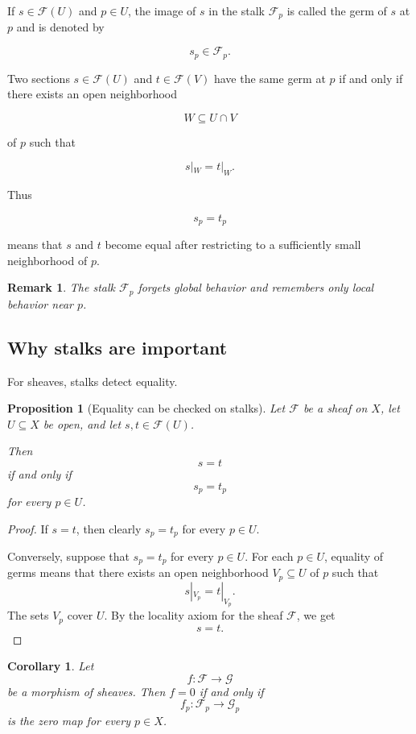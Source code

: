 \documentclass[12pt,a4paper]{article}
\theoremstyle{notespace}
\newtheorem{proposition}[definition]{Proposition}
\newtheorem{corollary}[definition]{Corollary}
\newtheorem{remark}[definition]{Remark}
\begin{document}
If $s \in \mathcal F(U)$ and $p \in U$, the image of $s$ in the stalk
$\mathcal F_p$ is called the germ of $s$ at $p$ and is denoted by

\[
s_p \in \mathcal F_p.
\]

Two sections $s \in \mathcal F(U)$ and $t \in \mathcal F(V)$ have the same germ
at $p$ if and only if there exists an open neighborhood

\[
W \subseteq U \cap V
\]

of $p$ such that

\[
s|_W = t|_W.
\]

Thus

\[
s_p=t_p
\]

means that $s$ and $t$ become equal after restricting to a sufficiently small
neighborhood of $p$.

\begin{remark}
	The stalk $\mathcal F_p$ forgets global behavior and remembers only local
	behavior near $p$.
\end{remark}

\subsection{Why stalks are important}
For sheaves, stalks detect equality.

\begin{proposition}[Equality can be checked on stalks]
	Let $\mathcal F$ be a sheaf on $X$, let $U \subseteq X$ be open, and let
	$s,t \in \mathcal F(U)$.
	
	Then
	\[
	s=t
	\]
	if and only if
	\[
	s_p=t_p
	\]
	for every $p \in U$.
\end{proposition}

\begin{proof}
	If $s=t$, then clearly $s_p=t_p$ for every $p \in U$.
	
	Conversely, suppose that $s_p=t_p$ for every $p \in U$.
	For each $p \in U$, equality of germs means that there exists an open
	neighborhood $V_p \subseteq U$ of $p$ such that
	\[
	s|_{V_p}=t|_{V_p}.
	\]
	The sets $V_p$ cover $U$.
	By the locality axiom for the sheaf $\mathcal F$, we get
	\[
	s=t.
	\]
\end{proof}

\begin{corollary}
	Let
	\[
	f : \mathcal F \longrightarrow \mathcal G
	\]
	be a morphism of sheaves. Then $f=0$ if and only if
	\[
	f_p : \mathcal F_p \longrightarrow \mathcal G_p
	\]
	is the zero map for every $p \in X$.
\end{corollary}
\end{document}

